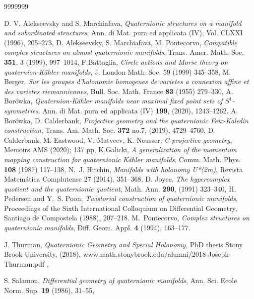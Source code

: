 \documentclass{amsart}
\begin{document}
\begin{thebibliography}{9999999}

 D. V. Alekseevsky and S. Marchiafava,
\emph{Quaternionic structures on a manifold and subordinated structures},
Ann. di Mat. pura ed applicata (IV), Vol. CLXXI (1996), 205--273,
 D. Alekseevsky, S. Marchiafava, M. Pontecorvo,
\emph{Compatible complex structures on almost quaternionic manifolds}, Trans.
Amer. Math. Soc. \textbf{351}, 3 (1999), 997--1014,
 F.Battaglia, \emph{Circle actions and Morse theory on quaternion-K\"ahler manifolds}, J. London Math. Soc. 59 (1999) 345--358,
 M. Berger, \emph{Sur les groupes d’holonomie homogenes de varietes a connexion affine et des
varietes riemanniennes}, Bull. Soc. Math. France \textbf{83} (1955) 279--330,
 A. Bor\'owka, \emph{Quaternion-Kähler manifolds near maximal fixed point sets of $S^1$-symmetries}. Ann. di Mat. pura ed applicata (IV) \textbf{199}, (2020), 1243--1262. 
 A. Bor\'owka, D. Calderbank, \emph{Projective geometry and the quaternionic Feix-Kaledin construction},  Trans.
Am. Math. Soc. \textbf{372} no.7, (2019), 4729--4760,
 D. Calderbank, M. Eastwood, V. Matveev, K. Neusser, \emph{C-projective geometry}, Memoirs AMS (2020); 137 pp,
 K.Galicki, \emph{A generalization of the momentum mapping construction for quaternionic K\"ahler manifolds}, Comm. Math. Phys. \textbf{108} (1987) 117--138,
  N.~J. Hitchin, \emph{Manifolds with holonomy U*(2m)}, Revista Matemática Complutense 27 (2014), 351--368,
  D. Joyce, \emph{The hypercomplex quotient and the quaternionic quotient}, Math. Ann. \textbf{290}, (1991) 323--340,
 H. Pedersen and Y.~S. Poon,
\emph{Twistorial construction of quaternionic manifolds}, Proceedings of the Sixth International Colloquium on Differential Geometry, Santiago de Compostela (1988), 207--218.
 M.~Pontecorvo, \emph{Complex structures on quaternionic
manifolds}, Diff. Geom. Appl. \textbf{4} (1994), 163--177.

 J. Thurman, \emph{Quaternionic Geometry and Special Holonomy}, PhD thesis Stony Brook University, (2018), www.math.stonybrook.edu/alumni/2018-Joseph-Thurman.pdf ,
 
 S. Salamon,
\emph{Differential geometry of quaternionic manifolds}, Ann. Sci. Ecole Norm.
Sup. \textbf{19} (1986), 31--55,
\end{thebibliography}
\end{document}
